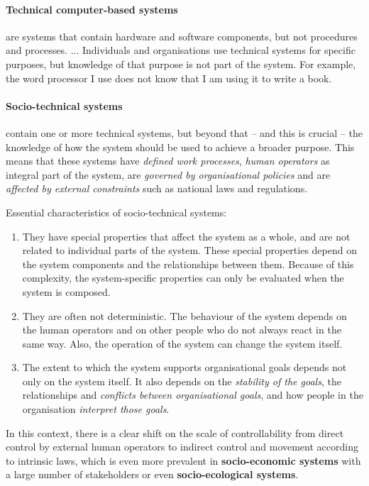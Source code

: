 \documentclass[11pt,a4paper]{article}
\begin{document}
\paragraph{Technical computer-based systems}
are systems that contain hardware and software components, but not procedures
and processes. ... Individuals and organisations use technical systems for
specific purposes, but knowledge of that purpose is not part of the system.
For example, the word processor I use does not know that I am using it to
write a book.

\paragraph{Socio-technical systems}
contain one or more technical systems, but beyond that -- and this is crucial
-- the knowledge of how the system should be used to achieve a broader
purpose.  This means that these systems have \emph{defined work processes},
\emph{human operators} as integral part of the system, are \emph{governed by
  organisational policies} and are \emph{affected by external constraints}
such as national laws and regulations.

Essential characteristics of socio-technical systems:
\begin{enumerate}
\item They have special properties that affect the system as a whole, and are
  not related to individual parts of the system. These special properties
  depend on the system components and the relationships between them. Because
  of this complexity, the system-specific properties can only be evaluated
  when the system is composed.
\item They are often not deterministic. The behaviour of the system depends on
  the human operators and on other people who do not always react in the same
  way. Also, the operation of the system can change the system itself.
\item The extent to which the system supports organisational goals depends not
  only on the system itself. It also depends on the \emph{stability of the
    goals}, the relationships and \emph{conflicts between organisational
    goals}, and how people in the organisation \emph{interpret those goals}.
\end{enumerate}

In this context, there is a clear shift on the scale of controllability from
direct control by external human operators to indirect control and movement
according to intrinsic laws, which is even more prevalent in
\textbf{socio-economic systems} with a large number of stakeholders or even
\textbf{socio-ecological systems}.
\end{document}
